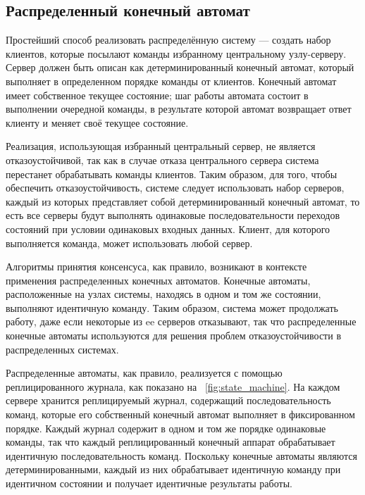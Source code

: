 \documentclass[subf, href, colorlinks=true, 14pt,
times, mtpro, specialist]{disser}
\newcommand{\figref}[1]{\figurename~\ref{#1}}
\theoremstyle{definition}
\begin{document}
\subsection{Распределенный конечный автомат}

Простейший способ реализовать распределённую систему --- создать набор клиентов, которые посылают команды избранному центральному узлу-серверу. Сервер должен быть описан как детерминированный конечный автомат, который выполняет в определенном порядке команды от клиентов. Конечный автомат имеет собственное текущее состояние; шаг работы автомата состоит в выполнении очередной команды, в результате которой автомат возвращает ответ клиенту и меняет своё текущее состояние.

Реализация, использующая избранный центральный сервер, не является отказоустойчивой, так как в случае отказа центрального сервера система перестанет обрабатывать команды клиентов. Таким образом, для
того, чтобы обеспечить отказоустойчивость, системе следует использовать набор серверов, каждый из которых представляет собой детерминированный конечный автомат, то есть все серверы будут выполнять одинаковые последовательности переходов состояний при условии одинаковых входных данных. Клиент, для которого выполняется команда, может использовать любой сервер.

Алгоритмы принятия консенсуса, как правило, возникают в контексте применения распределенных конечных автоматов. Конечные автоматы, расположенные на узлах системы, находясь в одном и том же состоянии, выполняют идентичную команду. Таким образом, система может продолжать работу, даже если некоторые из ee серверов отказывают, так что распределенные конечные автоматы используются для решения проблем отказоустойчивости в распределенных системах.

Распределенные автоматы, как правило, реализуется с помощью реплицированного журнала, как показано на \figref{fig:state_machine}. На каждом сервере хранится реплицируемый журнал, содержащий последовательность команд, которые его собственный конечный автомат выполняет в фиксированном порядке. Каждый журнал содержит в одном и том же порядке одинаковые команды,  так что каждый реплицированный конечный аппарат обрабатывает идентичную последовательность команд. Поскольку конечные автоматы являются детерминированными, каждый из них обрабатывает идентичную команду при идентичном состоянии и получает идентичные результаты работы.
\end{document}
